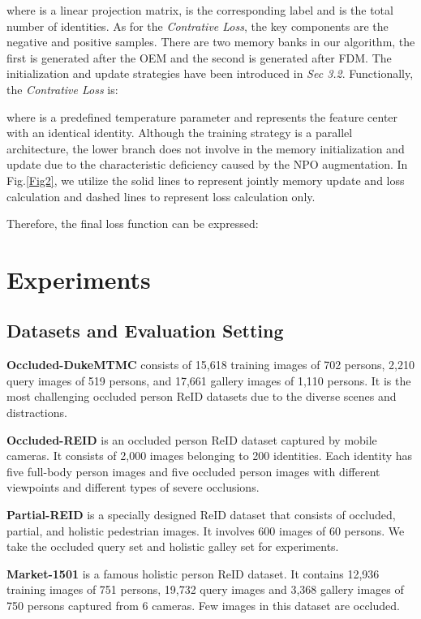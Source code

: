 \documentclass[10pt,twocolumn,letterpaper]{article}
\begin{document}
where  is a linear projection matrix,  is the corresponding label and  is the total number of identities. 
As for the \emph{Contrative Loss}, the key components are the negative and positive samples. There are two memory banks in our algorithm, the first is generated after the OEM and the second is generated after FDM. The initialization and update strategies have been introduced in \emph{Sec 3.2}. 
Functionally, the \emph{Contrative Loss} is:

where  is a predefined temperature parameter and  represents the feature center with an identical identity. 
Although the training strategy is a parallel architecture, the lower branch does not involve in the memory initialization and update due to the characteristic deficiency caused by the NPO augmentation. In Fig.\ref{Fig2}, we utilize the solid lines to represent jointly memory update and loss calculation and dashed lines to represent loss calculation only. 

Therefore, the final loss function can be expressed:



\section{Experiments}
\subsection{Datasets and Evaluation Setting}
\textbf{Occluded-DukeMTMC} \cite{miao2019pose} consists of 15,618 training images of 702 persons, 2,210 query images of 519 persons, and 17,661 gallery images of 1,110 persons. It is the most challenging occluded person ReID datasets due to the diverse scenes and distractions.

\textbf{Occluded-REID} \cite{zhuo2018occluded}  is an occluded person ReID dataset captured by mobile cameras. It consists of 2,000 images belonging to 200 identities. Each identity has five full-body person images and five occluded person images with different viewpoints and different types of severe occlusions.

\textbf{Partial-REID} \cite{zheng2015partial} is a specially designed ReID dataset that consists of occluded, partial, and holistic pedestrian images. It involves 600 images of 60 persons. We take the occluded query set and holistic galley set for experiments. 

\textbf{Market-1501} \cite{zheng2015scalable} is a famous holistic person ReID dataset. It contains 12,936 training images of 751 persons, 19,732 query images and 3,368 gallery images of 750 persons captured from 6 cameras. Few images in this dataset are occluded. 
\end{document}

